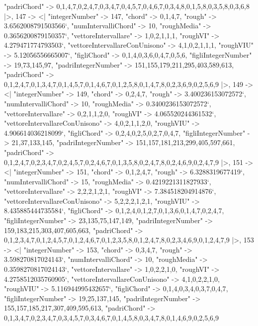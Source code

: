 \documentclass[
]{article}
\begin{document}
\begin{DatasetVerbatim}
    "padriChord" -> {{0,1,4,7},{0,2,4,7},{0,3,4,7},{0,4,5,7},{0,4,6,7},{0,3,4,8},{0,1,5,8},{0,3,5,8},{0,3,6,8}}
  |>,
  147 -> <|
    "integerNumber" -> 147,
    "chord" -> {0,1,4,7},
    "rough" -> 3.6562008791503566`,
    "numIntervalliChord" -> 10,
    "roughMedia" -> 0.3656200879150357`,
    "vettoreIntervallare" -> {1,0,2,1,1,1},
    "roughVI" -> 4.279471774793503`,
    "vettoreIntervallareConUnisono" -> {4,1,0,2,1,1,1},
    "roughVIU" -> 5.12056556665007`,
    "figliChord" -> {{0,1,4},{0,3,6},{0,4,7},{0,5,6}},
    "figliIntegerNumber" -> {19,73,145,97},
    "padriIntegerNumber" -> {151,155,179,211,295,403,589,613},
    "padriChord" -> {{0,1,2,4,7},{0,1,3,4,7},{0,1,4,5,7},{0,1,4,6,7},{0,1,2,5,8},{0,1,4,7,8},{0,2,3,6,9},{0,2,5,6,9}}
  |>,
  149 -> <|
    "integerNumber" -> 149,
    "chord" -> {0,2,4,7},
    "rough" -> 3.400236153072572`,
    "numIntervalliChord" -> 10,
    "roughMedia" -> 0.3400236153072572`,
    "vettoreIntervallare" -> {0,2,1,1,2,0},
    "roughVI" -> 4.065520244361532`,
    "vettoreIntervallareConUnisono" -> {4,0,2,1,1,2,0},
    "roughVIU" -> 4.906614036218099`,
    "figliChord" -> {{0,2,4},{0,2,5},{0,2,7},{0,4,7}},
    "figliIntegerNumber" -> {21,37,133,145},
    "padriIntegerNumber" -> {151,157,181,213,299,405,597,661},
    "padriChord" -> {{0,1,2,4,7},{0,2,3,4,7},{0,2,4,5,7},{0,2,4,6,7},{0,1,3,5,8},{0,2,4,7,8},{0,2,4,6,9},{0,2,4,7,9}}
  |>,
  151 -> <|
    "integerNumber" -> 151,
    "chord" -> {0,1,2,4,7},
    "rough" -> 6.3288319677419`,
    "numIntervalliChord" -> 15,
    "roughMedia" -> 0.4219221311827933`,
    "vettoreIntervallare" -> {2,2,2,1,2,1},
    "roughVI" -> 7.384518204914876`,
    "vettoreIntervallareConUnisono" -> {5,2,2,2,1,2,1},
    "roughVIU" -> 8.435885444735584`,
    "figliChord" -> {{0,1,2,4},{0,1,2,7},{0,1,3,6},{0,1,4,7},{0,2,4,7}},
    "figliIntegerNumber" -> {23,135,75,147,149},
    "padriIntegerNumber" -> {159,183,215,303,407,605,663},
    "padriChord" -> {{0,1,2,3,4,7},{0,1,2,4,5,7},{0,1,2,4,6,7},{0,1,2,3,5,8},{0,1,2,4,7,8},{0,2,3,4,6,9},{0,1,2,4,7,9}}
  |>,
  153 -> <|
    "integerNumber" -> 153,
    "chord" -> {0,3,4,7},
    "rough" -> 3.598270817024143`,
    "numIntervalliChord" -> 10,
    "roughMedia" -> 0.3598270817024143`,
    "vettoreIntervallare" -> {1,0,2,2,1,0},
    "roughVI" -> 4.2758512035760905`,
    "vettoreIntervallareConUnisono" -> {4,1,0,2,2,1,0},
    "roughVIU" -> 5.116944995432657`,
    "figliChord" -> {{0,1,4},{0,3,4},{0,3,7},{0,4,7}},
    "figliIntegerNumber" -> {19,25,137,145},
    "padriIntegerNumber" -> {155,157,185,217,307,409,595,613},
    "padriChord" -> {{0,1,3,4,7},{0,2,3,4,7},{0,3,4,5,7},{0,3,4,6,7},{0,1,4,5,8},{0,3,4,7,8},{0,1,4,6,9},{0,2,5,6,9}}

\end{DatasetVerbatim}
\end{document}
